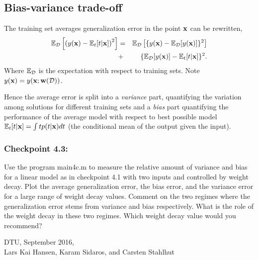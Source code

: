 \documentclass[times,12pt]{article}    %
\def\x{{\bf x}}
\def\w{{\bf w}}
\begin{document}
\subsection*{Bias-variance trade-off}
The training set averages generalization error in the point $\x$
can be rewritten,
\begin{eqnarray}
{\mathbb E}_{\cal D}\left[ \left(y(\x)-{\mathbb E}_{
t}[t|\x]\right)^2 \right]
& =& {\mathbb E}_{\cal D}\left[\{y(\x)- {\mathbb E}_{\cal D}[y(\x)]\}^2\right] \nonumber\\
&+& \{{\mathbb E}_{\cal D}[y(\x)] -{\mathbb E}_{t}[t|\x]\}^2.\nonumber
\end{eqnarray}
Where ${\mathbb E}_{\cal D}$ is the expectation with respect to training sets. Note $y(\x) = y(\x;\w({\cal D}))$.

Hence the average error is split into a {\it variance} part, quantifying
 the variation among
solutions for different training sets and a {\it bias} part
quantifying the performance of the average model with respect to
best possible model ${\mathbb E}_{t}[t|\x] = \int tp(t|\x)dt$ (the conditional
mean of the output given the input).


\subsubsection*{Checkpoint 4.3:}
Use the program {\sf main4c.m} to measure the relative amount of variance and bias
for a linear model as in checkpoint 4.1 with two inputs and controlled by weight
decay. Plot the average generalization error, the bias error, and the variance
error for a large range of weight decay values. Comment on the two
regimes where the generalization error stems from variance and bias respectively.
What is the role of the weight decay in these two regimes.
Which weight decay value would you recommend?


\iffalse
\subsubsection*{Challenge:}
 Consider a linear model and simulated data sets of various size $N$ from a given (high dimensional) weight vector, say $d=300$, with random input vectors and additive normal noise. Plot the learning curve (test error as function of sample size) for different values of the weight decay $\alpha$.
\fi


\vspace*{1cm}
\noindent DTU, September 2016,\\[2mm]
Lars Kai Hansen, Karam Sidaros, and Carsten Stahlhut
\end{document}
